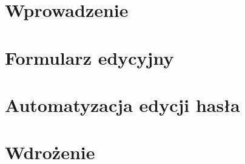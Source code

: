 \label{chap:impl}
\section{Wprowadzenie}

\section{Formularz edycyjny}
\label{sec:impl-form}

\section{Automatyzacja edycji hasła}
\label{sec:impl-auto}

\section{Wdrożenie}

